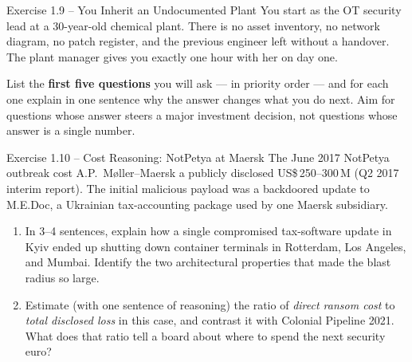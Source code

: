 \documentclass[11pt,a4paper]{article}
\begin{document}
\begin{taskbox}{Exercise 1.9 -- You Inherit an Undocumented Plant}
You start as the OT security lead at a 30-year-old chemical plant. There is no asset inventory, no network diagram, no patch register, and the previous engineer left without a handover. The plant manager gives you exactly one hour with her on day one.

List the \textbf{first five questions} you will ask --- in priority order --- and for each one explain in one sentence why the answer changes what you do next. Aim for questions whose answer steers a major investment decision, not questions whose answer is a single number.
\end{taskbox}

\begin{taskbox}{Exercise 1.10 -- Cost Reasoning: NotPetya at Maersk}
The June 2017 NotPetya outbreak cost A.P.\ M{\o}ller--Maersk a publicly disclosed US\$\,250--300\,M (Q2 2017 interim report). The initial malicious payload was a backdoored update to M.E.Doc, a Ukrainian tax-accounting package used by one Maersk subsidiary.
\begin{enumerate}
  \item In 3--4 sentences, explain how a single compromised tax-software update in Kyiv ended up shutting down container terminals in Rotterdam, Los Angeles, and Mumbai. Identify the two architectural properties that made the blast radius so large.
  \item Estimate (with one sentence of reasoning) the ratio of \emph{direct ransom cost} to \emph{total disclosed loss} in this case, and contrast it with Colonial Pipeline 2021. What does that ratio tell a board about where to spend the next security euro?
\end{enumerate}
\end{taskbox}
\end{document}
